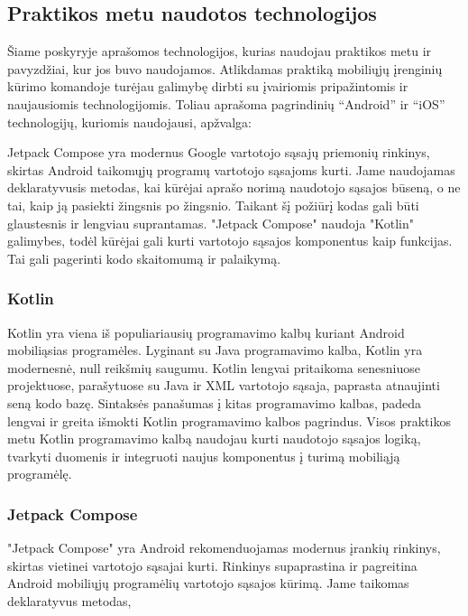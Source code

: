 \newpage

\subsection{Praktikos metu naudotos technologijos}
Šiame poskyryje aprašomos technologijos, kurias naudojau praktikos metu ir pavyzdžiai, kur jos buvo naudojamos. 
Atlikdamas praktiką mobiliųjų įrenginių kūrimo komandoje turėjau galimybę dirbti su įvairiomis pripažintomis ir naujausiomis technologijomis. Toliau aprašoma pagrindinių \enquote{Android} ir \enquote{iOS} technologijų, kuriomis naudojausi, apžvalga:

Jetpack Compose yra modernus Google vartotojo sąsajų priemonių rinkinys, skirtas Android taikomųjų programų vartotojo sąsajoms kurti. Jame naudojamas deklaratyvusis metodas, kai kūrėjai aprašo norimą naudotojo sąsajos būseną, o ne tai, kaip ją pasiekti žingsnis po žingsnio. Taikant šį požiūrį kodas gali būti glaustesnis ir lengviau suprantamas.  "Jetpack Compose" naudoja "Kotlin" galimybes, todėl kūrėjai gali kurti vartotojo sąsajos komponentus kaip funkcijas.  Tai gali pagerinti kodo skaitomumą ir palaikymą.


\subsubsection{Kotlin}
Kotlin yra viena iš populiariausių programavimo kalbų kuriant Android mobiliąsias programėles. Lyginant su Java programavimo kalba, Kotlin yra modernesnė, null reikšmių saugumu. Kotlin lengvai pritaikoma senesniuose projektuose, parašytuose su Java ir XML vartotojo sąsaja, paprasta atnaujinti seną kodo bazę. Sintaksės panašumas į kitas programavimo kalbas, padeda lengvai ir greita išmokti Kotlin programavimo kalbos pagrindus.
Visos praktikos metu Kotlin programavimo kalbą naudojau kurti naudotojo sąsajos logiką, tvarkyti duomenis ir integruoti naujus komponentus į turimą mobiliąją programėlę.

\subsubsection{Jetpack Compose}

"Jetpack Compose" yra Android rekomenduojamas modernus įrankių rinkinys, skirtas vietinei vartotojo sąsajai kurti. Rinkinys supaprastina ir pagreitina Android mobiliųjų programėlių vartotojo sąsajos kūrimą. Jame taikomas deklaratyvus metodas,

